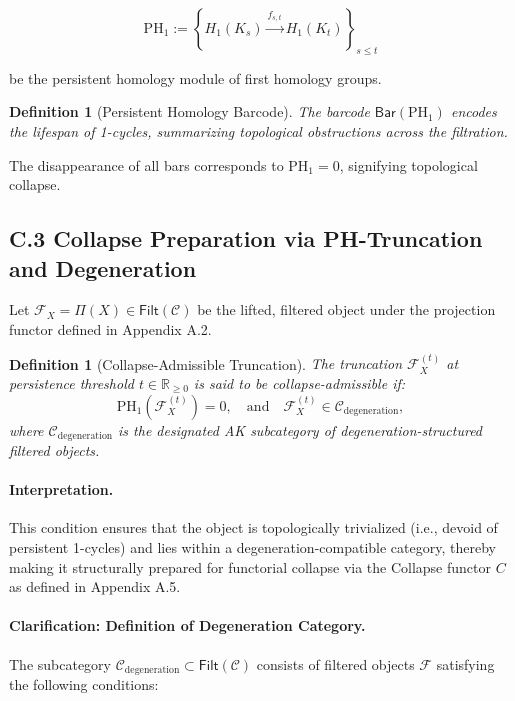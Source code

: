 \documentclass[11pt]{article}
\newtheorem{definition}[theorem]{Definition}
\begin{document}
\[
\mathrm{PH}_1 := \left\{ H_1(K_s) \xrightarrow{f_{s,t}} H_1(K_t) \right\}_{s \leq t}
\]

be the persistent homology module of first homology groups.

\begin{definition}[Persistent Homology Barcode]
The barcode \( \mathsf{Bar}(\mathrm{PH}_1) \) encodes the lifespan of 1-cycles, summarizing topological obstructions across the filtration.
\end{definition}

The disappearance of all bars corresponds to \( \mathrm{PH}_1 = 0 \), signifying topological collapse.

\subsection*{C.3 Collapse Preparation via PH-Truncation and Degeneration}

Let \( \mathcal{F}_X = \Pi(X) \in \mathsf{Filt}(\mathcal{C}) \) be the lifted, filtered object under the projection functor defined in Appendix A.2.

\begin{definition}[Collapse-Admissible Truncation]
The truncation \( \mathcal{F}_X^{(t)} \) at persistence threshold \( t \in \mathbb{R}_{\geq 0} \) is said to be \emph{collapse-admissible} if:
\[
\mathrm{PH}_1(\mathcal{F}_X^{(t)}) = 0, \quad \text{and} \quad \mathcal{F}_X^{(t)} \in \mathcal{C}_{\mathrm{degeneration}},
\]
where \( \mathcal{C}_{\mathrm{degeneration}} \) is the designated AK subcategory of degeneration-structured filtered objects.
\end{definition}

\paragraph{Interpretation.}  
This condition ensures that the object is topologically trivialized (i.e., devoid of persistent 1-cycles) and lies within a degeneration-compatible category, thereby making it structurally prepared for functorial collapse via the Collapse functor \( C \) as defined in Appendix A.5.

\paragraph{Clarification: Definition of Degeneration Category.}  
The subcategory \( \mathcal{C}_{\mathrm{degeneration}} \subset \mathsf{Filt}(\mathcal{C}) \) consists of filtered objects \( \mathcal{F} \) satisfying the following conditions:
\end{document}
